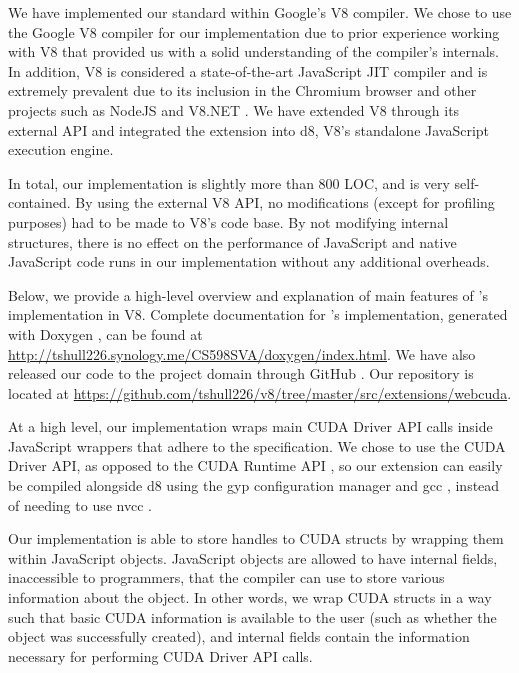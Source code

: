 
We have implemented our \name standard within Google's V8 \cite{V8website}
compiler.   We chose to use the Google V8  compiler for our implementation due
to prior experience working with V8 that  provided us with a solid
understanding of the compiler's internals. In addition, V8 is considered
a state-of-the-art JavaScript JIT compiler and is extremely prevalent due to its
inclusion in the Chromium browser \cite{chromium} and other projects such as
NodeJS \cite{nodeJS} and V8.NET \cite{V8.NET}. We have extended V8 through its
external API and integrated the extension into d8, V8's standalone JavaScript
execution engine. 

In total, our implementation is slightly more than 800 LOC, and is very
self-contained. By using the external V8 API, no modifications (except for
profiling purposes) had to be made to V8's code base. By not modifying internal
structures, there is no effect on the performance of JavaScript and native
JavaScript code runs in our implementation without any additional overheads.

Below, we provide a high-level overview and explanation of main features of
\namens's implementation in V8.  Complete documentation for \namens's implementation,
generated with Doxygen \cite{doxygen}, can be found at
\url{http://tshull226.synology.me/CS598SVA/doxygen/index.html}. We
have also released our code to the project domain through GitHub \cite{github}.
Our repository is located at
\url{https://github.com/tshull226/v8/tree/master/src/extensions/webcuda}.

At a high level, our implementation wraps main CUDA Driver API \cite{cudaAPI}
calls inside JavaScript wrappers that adhere to the \name specification. We
chose to use the CUDA Driver API, as opposed to the CUDA Runtime API
\cite{cudaRuntimeAPI}, so our extension can easily be compiled alongside d8
using the gyp \cite{gyp} configuration manager and gcc \cite{gcc}, instead of
needing to use nvcc \cite{nvcc}.

Our implementation is able to store handles to CUDA structs by wrapping them
within JavaScript objects. JavaScript objects are allowed to have internal
fields, inaccessible to programmers, that the compiler can use to store various
information about the object. In other words, we wrap CUDA structs in a way such that
basic CUDA information is available to the user (such as whether the object was
successfully created), and internal fields contain the information
necessary for performing CUDA Driver API calls.

